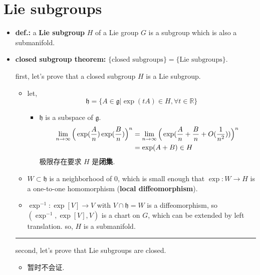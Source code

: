 \section{Lie subgroups}
\begin{itemize}
	\item \textbf{def.:} a \textbf{Lie subgroup} $H$ of a Lie group $G$ is a subgroup which is also a submanifold.
	
	\item \textbf{closed subgroup theorem:} $\{\text{closed subgroups}\} = \{\text{Lie subgroups}\}$.
	
	\begin{tcolorbox}[title=proof:]
		first, let's prove that a closed subgroup $H$ is a Lie subgroup.
		\begin{itemize}
			\item let,
			\begin{equation}
				\mathfrak{h} = \{A \in \mathfrak{g} | \exp(t A) \in H, \forall t \in \mathbb{R}\}
			\end{equation}
			\begin{itemize}
				\item $\mathfrak{h}$ is a subspace of $\mathfrak{g}$.
				\begin{align}
					\lim_{n \rightarrow \infty} \Big( \exp(\frac{A}{n}) \exp(\frac{B}{n}) \Big)^n &= \lim_{n \rightarrow \infty} \Big( \exp(\frac{A}{n} + \frac{B}{n} + O(\frac{1}{n^2})) \Big)^n \notag \\
					&= \exp(A + B) \in H
				\end{align}
				极限存在要求 $H$ 是\textbf{闭集}.
			\end{itemize}
			
			\item $W \subset \mathfrak{h}$ is a neighborhood of $0$, which is small enough that $\exp : W \rightarrow H$ is a one-to-one homomorphism (\textbf{local diffeomorphism}).
			
			\item $\exp^{- 1} : \exp[V] \rightarrow V$ with $V \cap \mathfrak{h} = W$ is a diffeomorphism, so $(\exp^{- 1}, \exp[V], V)$ is a chart on $G$, which can be extended by left translation. so, $H$ is a submanifold.
		\end{itemize}
		
		\noindent\rule[0.5ex]{\linewidth}{0.5pt} %
		
		second, let's prove that Lie subgroups are closed.
		\begin{itemize}
			\item 暂时不会证.
		\end{itemize}
	\end{tcolorbox}
\end{itemize}
